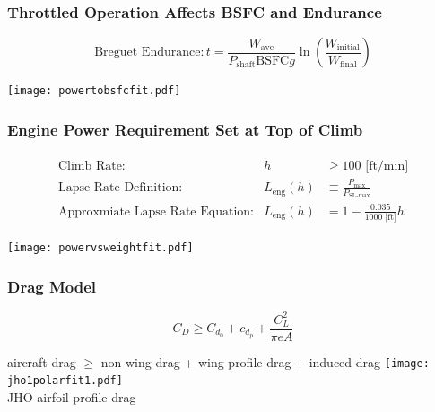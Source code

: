 \documentclass{beamer}
\begin{document}
\begin{frame}
    \frametitle{Throttled Operation Affects BSFC and Endurance}

    \pause
    \[ \text{Breguet Endurance}: t = \frac{W_{\text{ave}}}{P_{\text{shaft}}\text{BSFC}g} \ln{\left( \frac{W_{\text{initial}}}{W_{\text{final}}}\right)} \]
        
    \pause
    \begin{center}
    \texttt{[image: powertobsfcfit.pdf]}
    \end{center}

\end{frame}
        
\begin{frame}
    \frametitle{Engine Power Requirement Set at Top of Climb}

    \pause
    \scriptsize
    \[ \begin{array}{rrl}
            \text{Climb Rate}: & \dot{h} &\geq 100 \text{ [ft/min]} \\
            \text{Lapse Rate Definition}: &L_{\text{eng}}(h) &\equiv \frac{P_{\text{max}}}{P_{\text{SL-max}}} \\
            \text{Approxmiate Lapse Rate Equation}: & L_{\text{eng}}(h) &= 1 - \frac{0.035}{1000 \text{ [ft]}} h
    \end{array} \]

    \pause
    \begin{center}
    \texttt{[image: powervsweightfit.pdf]}
    \end{center}

\end{frame}

\begin{frame}
    \frametitle{Drag Model}

    \pause
    \[ C_D \geq C_{d_0} + c_{d_p} + \frac{C_L^2}{\pi e A} \]

    \begin{center}
    aircraft drag $\geq$ non-wing drag + wing profile drag + induced drag
    \pause
    \texttt{[image: jho1polarfit1.pdf]} \\
    \scriptsize
    JHO airfoil profile drag
    \end{center}
    
\end{frame}
\end{document}
